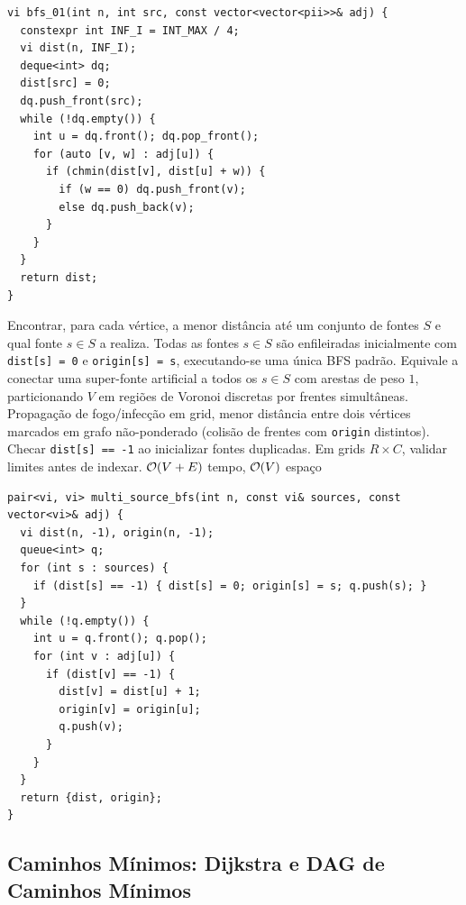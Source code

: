 \begin{lstlisting}
vi bfs_01(int n, int src, const vector<vector<pii>>& adj) {
  constexpr int INF_I = INT_MAX / 4;
  vi dist(n, INF_I);
  deque<int> dq;
  dist[src] = 0;
  dq.push_front(src);
  while (!dq.empty()) {
    int u = dq.front(); dq.pop_front();
    for (auto [v, w] : adj[u]) {
      if (chmin(dist[v], dist[u] + w)) {
        if (w == 0) dq.push_front(v);
        else dq.push_back(v);
      }
    }
  }
  return dist;
}
\end{lstlisting}

\algobox
  {Encontrar, para cada vértice, a menor distância até um conjunto de fontes $S$ e qual fonte $s \in S$ a realiza.}
  {Todas as fontes $s \in S$ são enfileiradas inicialmente com \texttt{dist[s] = 0} e \texttt{origin[s] = s}, executando-se uma única BFS padrão.}
  {Equivale a conectar uma super-fonte artificial a todos os $s \in S$ com arestas de peso $1$, particionando $V$ em regiões de Voronoi discretas por frentes simultâneas.}
  {Propagação de fogo/infecção em grid, menor distância entre dois vértices marcados em grafo não-ponderado (colisão de frentes com \texttt{origin} distintos).}
  {Checar \texttt{dist[s] == -1} ao inicializar fontes duplicadas. Em grids $R \times C$, validar limites antes de indexar.}
  {$\mathcal{O}(V + E)$ tempo, $\mathcal{O}(V)$ espaço}

\begin{lstlisting}
pair<vi, vi> multi_source_bfs(int n, const vi& sources, const vector<vi>& adj) {
  vi dist(n, -1), origin(n, -1);
  queue<int> q;
  for (int s : sources) {
    if (dist[s] == -1) { dist[s] = 0; origin[s] = s; q.push(s); }
  }
  while (!q.empty()) {
    int u = q.front(); q.pop();
    for (int v : adj[u]) {
      if (dist[v] == -1) {
        dist[v] = dist[u] + 1;
        origin[v] = origin[u];
        q.push(v);
      }
    }
  }
  return {dist, origin};
}
\end{lstlisting}

\subsection{Caminhos Mínimos: Dijkstra e DAG de Caminhos Mínimos}

